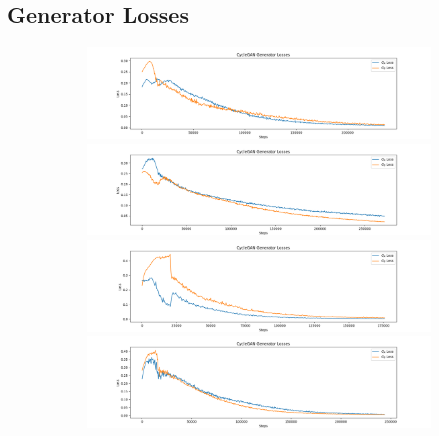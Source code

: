 \documentclass[12pt, fleqn, titlepage]{article}
\begin{document}
\subsection{Generator Losses}\label{gen_loss}
\begin{figure}[H]
	\centering
	\begin{subfigure}[b]{0.8\textwidth}
		\centering
		\includegraphics[width=\linewidth]{imgs/generator_losses/XY_model_generator_losses}
		\hfill
		\includegraphics[width=\linewidth]{imgs/generator_losses/XZ_model_generator_losses}
		\hfill
		\includegraphics[width=\linewidth]{imgs/generator_losses/YZ_model_generator_losses}
		\hfill
		\includegraphics[width=\linewidth]{imgs/generator_losses/ALL_model_generator_losses}
	\end{subfigure}
\end{figure}
\end{document}
